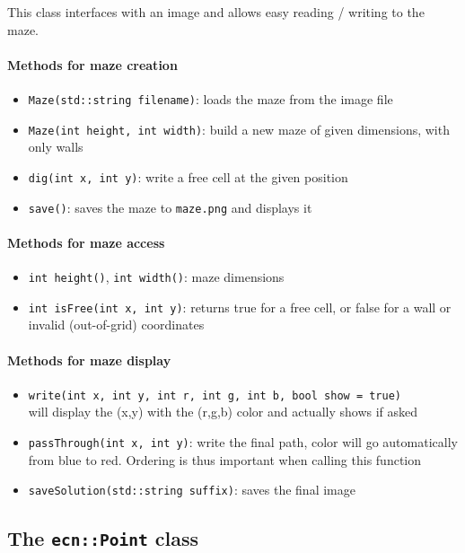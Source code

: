 \documentclass{ecnreport}
\begin{document}
This class interfaces with an image and allows easy reading / writing to the maze. 

\paragraph{Methods for maze creation}
\begin{itemize}
 \item \texttt{Maze(std::string filename)}: loads the maze from the image file
 \item \texttt{Maze(int height, int width)}: build a new maze of given dimensions, with only walls
 \item \texttt{dig(int x, int y)}: write a free cell at the given position
 \item \texttt{save()}: saves the maze to \texttt{maze.png} and displays it
\end{itemize}

\paragraph{Methods for maze access}
\begin{itemize}
 \item \texttt{int height()}, \texttt{int width()}: maze dimensions
 \item \texttt{int isFree(int x, int y)}: returns true for a free cell, or false for a wall or invalid (out-of-grid) coordinates
\end{itemize}

\paragraph{Methods for maze display}
\begin{itemize}
 \item \texttt{write(int x, int y, int r, int g, int b, bool show = true)}\\
    will display the (x,y) with the (r,g,b) color and actually shows if asked
 \item \texttt{passThrough(int x, int y)}: write the final path, color will go automatically from blue to red. 
 Ordering is thus important when calling this function
 \item \texttt{saveSolution(std::string suffix)}: saves the final image
\end{itemize}

\subsection{The \texttt{ecn::Point} class}\label{ptClass}
\end{document}
